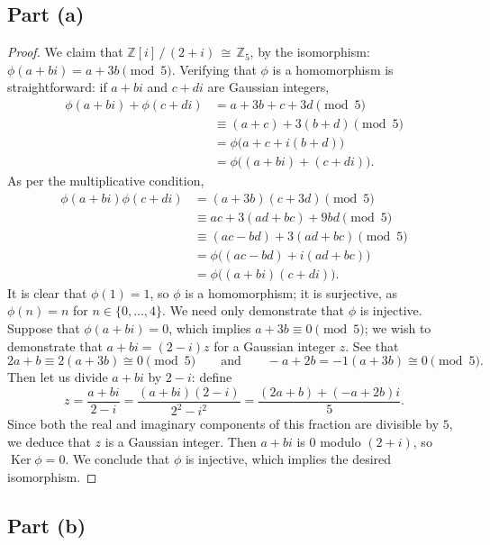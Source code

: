 \documentclass[11pt]{article}
\newcommand{\Ker}{\operatorname{Ker}}
\begin{document}
\subsection{Part (a)}
\begin{proof}
We claim that $\boxed{\mathbb{Z}[i] \,/\, (2 + i) \, \cong \, \mathbb{Z}_{5}}$, by the isomorphism: $\phi(a + bi) = a + 3b \pmod{5}$. Verifying that $\phi$ is a homomorphism is straightforward: if $a + bi$ and $c + di$ are Gaussian integers,
\begin{align*}
  \phi(a + bi) + \phi(c + di) &= a + 3b + c + 3d \pmod{5} \\
  &\equiv (a + c) + 3(b + d) \pmod{5} \\
  &= \phi \big( a + c + i(b + d) \big) \\
  &= \phi \big( (a + bi) + (c + di) \big).
\end{align*}
As per the multiplicative condition,
\begin{align*}
  \phi(a + bi) \phi(c + di) &= (a + 3b)(c + 3d) \pmod{5} \\
                            &\equiv ac + 3(ad + bc) + 9bd \pmod{5} \\
                            &\equiv (ac - bd) + 3(ad + bc) \pmod{5} \\
                            &= \phi \big( (ac - bd) + i(ad + bc) \big) \\
                            &= \phi \big( (a + bi)(c + di) \big).
\end{align*}
It is clear that $\phi(1) = 1$, so $\phi$ is a homomorphism; it is surjective, as $\phi(n) = n$ for $n \in \{ 0, \ldots, 4 \}$. We need only demonstrate that $\phi$ is injective. Suppose that $\phi(a + bi) = 0$, which implies $a + 3b \equiv 0 \pmod{5}$; we wish to demonstrate that $a + bi = (2 - i)z$ for a Gaussian integer $z$. See that
\[
  2a + b \equiv 2(a + 3b) \cong 0 \pmod{5} \qquad \text{and} \qquad -a + 2b = -1(a + 3b) \cong 0 \pmod{5}.
\]
Then let us divide $a + bi$ by $2 - i$: define
\[
  z = \frac{a + bi}{2 - i} = \frac{(a + bi)(2 - i)}{2^{2} - i^{2}} = \frac{(2a + b) + (-a + 2b)i}{5}.
\]
Since both the real and imaginary components of this fraction are divisible by $5$, we deduce that $z$ is a Gaussian integer. Then $a + bi$ is $0$ modulo $(2 + i)$, so $\Ker \phi = 0$. We conclude that $\phi$ is injective, which implies the desired isomorphism.
\end{proof}

\subsection{Part (b)}
\end{document}
